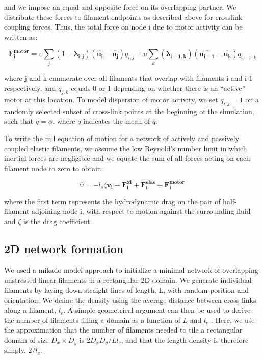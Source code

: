 \documentclass[10pt,letterpaper]{article}
\begin{document}
and we impose an equal and opposite force on its overlapping partner.  We distribute these forces to filament endpoints as described above for crosslink coupling forces.  Thus, the total force on node i due to motor activity can be written as:

\begin{equation}
\label{eqn:active}
\mathbf{F^{motor}_{i}} = \upsilon \sum_j (1 - \mathbf{\lambda_{i,j}}) \left (\mathbf{\hat{u_{i}}} - \mathbf{\hat{u_j}} \right ) q_{i,j}
                        +  \upsilon \sum_k (\mathbf{\lambda_{i-1,k}}) \left (\mathbf{\hat{u_{i-1}}} - \mathbf{\hat{u_k}} \right ) q_{i-1,k} 
\end{equation}


where j and k enumerate over all filaments that overlap with filaments i and i-1 respectively, and $q_{j,k}$ equals 0 or 1 depending on whether there is an ``active'' motor at this location. To model dispersion of motor activity, we set $q_{i,j}=1$  on a randomly selected subset of cross-link points at the beginning of the simulation, such that $\bar{q}=\phi$, where $\bar{q}$ indicates the mean of $q$.


To write the full equation of motion for a network of actively and passively coupled elastic filaments, we assume the low Reynold's number limit in which inertial forces are negligible and we equate the sum of all forces acting on each filament node to zero to obtain:

\begin{equation}
\label{eqn:syst3}
0=-l_s\zeta\mathbf{ v_i} -\mathbf{F^{xl}_i}+ \mathbf{F^{elas}_i}+\mathbf{F^{motor}_i} 
\end{equation}

where the first term represents the hydrodynamic drag on the pair of half-filament adjoining node i, with respect to motion against the surrounding fluid and $\zeta$ is the drag coefficient.

\subsection*{2D network formation}

We used a mikado model approach \cite{Unterberger2014} to initialize a minimal network of overlapping unstressed linear filaments in a rectangular 2D domain. We generate individual filaments by laying down straight lines of length, L, with random position and orientation. We define the density using the average distance between cross-links along a filament, $l_c$. A simple geometrical argument can then be used to derive the number of filaments filling a domain as a function of $L$ and $l_c$ \cite{theo_hlm}.  Here, we use the approximation that the number of filaments needed to tile a rectangular domain of size $D_x \times D_y$  is $2D_xD_y/Ll_c$, and that the length density is therefore simply, $2/l_c$. 
\end{document}
